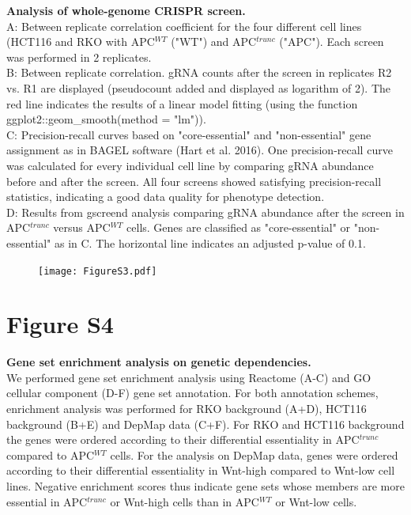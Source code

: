 \documentclass[11pt,a4paper,titlepage]{article}
\begin{document}
\textbf{Analysis of whole-genome CRISPR screen.}\\
A: Between replicate correlation coefficient for the four different cell lines (HCT116 and RKO with APC$^{WT}$ ("WT") and APC$^{trunc}$ ("APC"). Each screen was performed in 2 replicates. \\
B: Between replicate correlation. gRNA counts after the screen in replicates R2 vs. R1 are displayed (pseudocount added and displayed as logarithm of 2). The red line indicates the results of a linear model fitting (using the function ggplot2::geom\_smooth(method = "lm")). \\
C: Precision-recall curves based on "core-essential" and "non-essential" gene assignment as in BAGEL software (Hart et al. 2016). One precision-recall curve was calculated for every individual cell line by comparing gRNA abundance before and after the screen. All four screens showed satisfying precision-recall statistics, indicating a good data quality for phenotype detection.\\
D: Results from gscreend analysis comparing gRNA abundance after the screen in APC$^{trunc}$ versus APC$^{WT}$ cells. Genes are classified as "core-essential" or "non-essential" as in C. The horizontal line indicates an adjusted p-value of 0.1.\\

\begin{figure}[h]
\texttt{[image: FigureS3.pdf]} 
\end{figure}

\clearpage

\pagebreak
\section*{Figure S4}
\textbf{Gene set enrichment analysis on genetic dependencies.}\\
We performed gene set enrichment analysis using Reactome (A-C) and GO cellular component (D-F) gene set annotation. For both annotation schemes, enrichment analysis was performed for RKO background (A+D), HCT116 background (B+E) and DepMap data (C+F). For RKO and HCT116 background the genes were ordered according to their differential essentiality in APC$^{trunc}$ compared to APC$^{WT}$ cells. For the analysis on DepMap data, genes were ordered according to their differential essentiality in Wnt-high compared to Wnt-low cell lines. Negative enrichment scores thus indicate gene sets whose members are more essential in APC$^{trunc}$ or Wnt-high cells than in APC$^{WT}$ or Wnt-low cells. \\
\end{document}
